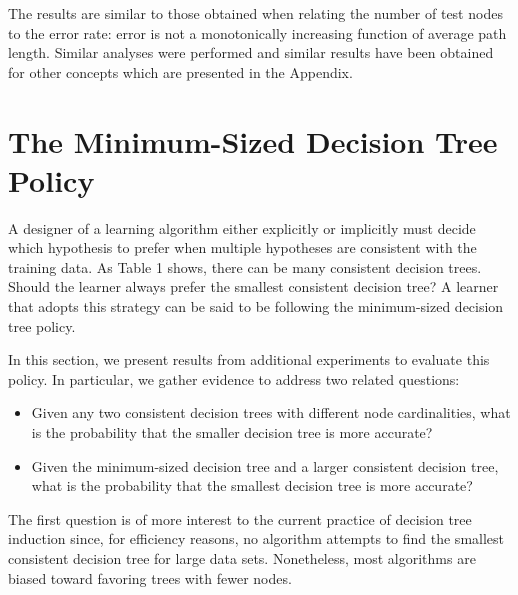 The results are similar to
those obtained when relating the number of test nodes to the error
rate: error is not a monotonically increasing function of average path
length.  Similar analyses were performed and similar results have been
obtained for other concepts which are presented in the Appendix.

\section{The Minimum-Sized Decision Tree Policy}

A designer of a learning algorithm either explicitly or implicitly
must decide which hypothesis to prefer when multiple hypotheses are
consistent with the training data.  As Table 1 shows, there can be
many consistent decision trees.  Should the learner always prefer the
smallest consistent decision tree?  A learner that adopts this
strategy can be said to be following the minimum-sized decision tree
policy.  

\newpage

In this section, we present results from additional experiments 
to evaluate this policy.  In particular, we gather evidence to address two
related questions:

\begin{itemize}
  \item Given any two consistent decision trees with different node
        cardinalities, what is the probability that the smaller 
        decision tree is more accurate?
  \item Given the minimum-sized decision tree and a larger
        consistent decision tree, what is the probability that the 
        smallest decision tree is more accurate?
\end{itemize}

The first question is of more interest to the current practice of
decision tree induction since, for efficiency reasons, no algorithm
attempts to find the smallest consistent decision tree for large
data sets.  Nonetheless, most algorithms are biased toward favoring
trees with fewer nodes.  

\vspace*{0.3cm}
\hspace{1.0cm}
\centerline{}

\hspace{1.1cm}
\centerline{}

